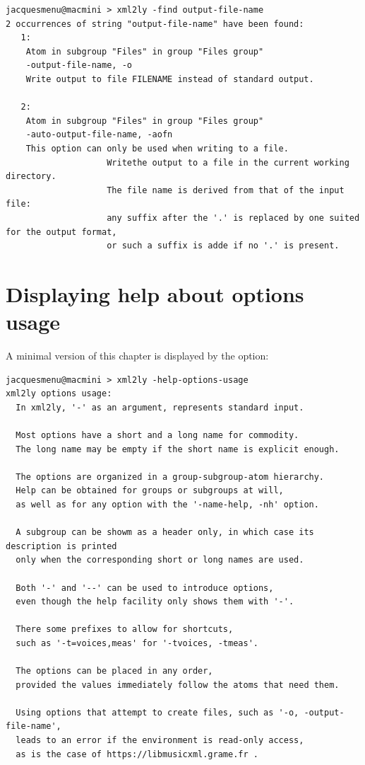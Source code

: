 \begin{lstlisting}[language=Terminal]
jacquesmenu@macmini > xml2ly -find output-file-name
2 occurrences of string "output-file-name" have been found:
   1:
    Atom in subgroup "Files" in group "Files group"
    -output-file-name, -o
    Write output to file FILENAME instead of standard output.
  
   2:
    Atom in subgroup "Files" in group "Files group"
    -auto-output-file-name, -aofn
    This option can only be used when writing to a file.
                    Writethe output to a file in the current working directory.
                    The file name is derived from that of the input file:
                    any suffix after the '.' is replaced by one suited for the output format,
                    or such a suffix is adde if no '.' is present.
\end{lstlisting}


\section{Displaying help about options usage}

A minimal version of this chapter is displayed by the  option:
\begin{lstlisting}[language=Terminal]
jacquesmenu@macmini > xml2ly -help-options-usage
xml2ly options usage:
  In xml2ly, '-' as an argument, represents standard input.

  Most options have a short and a long name for commodity.
  The long name may be empty if the short name is explicit enough.

  The options are organized in a group-subgroup-atom hierarchy.
  Help can be obtained for groups or subgroups at will,
  as well as for any option with the '-name-help, -nh' option.

  A subgroup can be showm as a header only, in which case its description is printed
  only when the corresponding short or long names are used.

  Both '-' and '--' can be used to introduce options,
  even though the help facility only shows them with '-'.

  There some prefixes to allow for shortcuts,
  such as '-t=voices,meas' for '-tvoices, -tmeas'.

  The options can be placed in any order,
  provided the values immediately follow the atoms that need them.

  Using options that attempt to create files, such as '-o, -output-file-name',
  leads to an error if the environment is read-only access,
  as is the case of https://libmusicxml.grame.fr .
\end{lstlisting}


